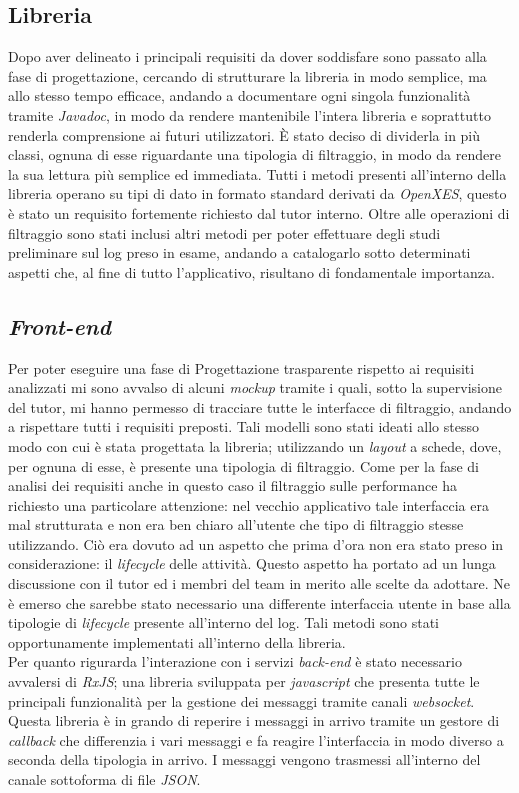 \subsection{Libreria}
Dopo aver delineato i principali requisiti da dover soddisfare sono passato alla fase di progettazione, cercando di strutturare la libreria in modo semplice, ma allo stesso tempo efficace, andando a documentare ogni singola funzionalità tramite \textit{\gls{Javadoc}}, in modo da rendere mantenibile l'intera libreria e soprattutto renderla comprensione ai futuri utilizzatori. È stato deciso di dividerla in più classi, ognuna di esse riguardante una tipologia di filtraggio, in modo da rendere la sua lettura più semplice ed immediata. Tutti i metodi presenti all'interno della libreria operano su tipi di dato in formato standard derivati da \textit{OpenXES}, questo è stato un requisito fortemente richiesto dal tutor interno. Oltre alle operazioni di filtraggio sono stati inclusi altri metodi per poter effettuare degli studi preliminare sul log preso in esame, andando a catalogarlo sotto determinati aspetti che, al fine di tutto l'applicativo, risultano di fondamentale importanza.
\subsection{\textit{Front-end}}
Per poter eseguire una fase di Progettazione trasparente rispetto ai requisiti analizzati mi sono avvalso di alcuni \textit{\gls{mockup}} tramite i quali, sotto la supervisione del tutor, mi hanno permesso di tracciare tutte le interfacce di filtraggio, andando a rispettare tutti i requisiti preposti. Tali modelli sono stati ideati allo stesso modo con cui è stata progettata la libreria; utilizzando un \textit{layout} a schede, dove, per ognuna di esse, è presente una tipologia di filtraggio. Come per la fase di analisi dei requisiti anche in questo caso il filtraggio sulle performance ha richiesto una particolare attenzione: nel vecchio applicativo tale interfaccia era mal strutturata e non era ben chiaro all'utente che tipo di filtraggio stesse utilizzando. Ciò era dovuto ad un aspetto che prima d'ora non era stato preso in considerazione: il \textit{lifecycle} delle attività. Questo aspetto ha portato ad un lunga discussione con il tutor ed i membri del team in merito alle scelte da adottare. Ne è emerso che sarebbe stato necessario una differente interfaccia utente in base alla tipologie di \textit{lifecycle} presente all'interno del log. Tali metodi sono stati opportunamente implementati all'interno della libreria.\\
Per quanto rigurarda l'interazione con i servizi \textit{back-end} è stato necessario avvalersi di \textit{RxJS}; una libreria sviluppata per \textit{javascript} che presenta tutte le principali funzionalità per la gestione dei messaggi tramite canali \textit{websocket}. Questa libreria è in grando di reperire i messaggi in arrivo tramite un gestore di \textit{callback} che differenzia i vari messaggi e fa reagire l'interfaccia in modo diverso a seconda della tipologia in arrivo. I messaggi vengono trasmessi all'interno del canale sottoforma di file \textit{\gls{JSON}}.

